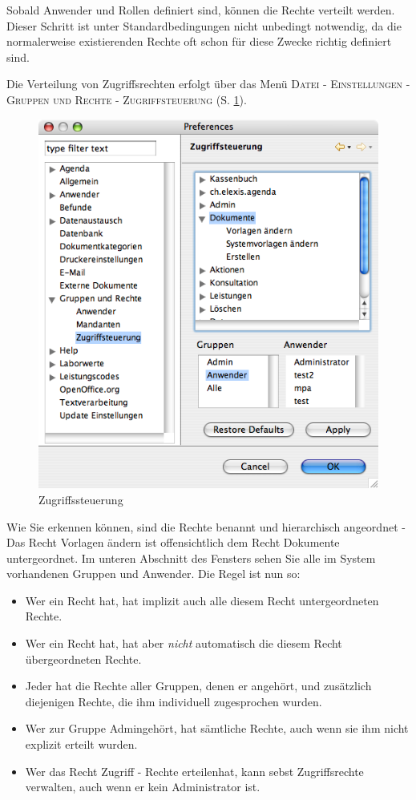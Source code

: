 Sobald Anwender und Rollen definiert sind, können die Rechte verteilt werden.
Dieser Schritt ist unter Standardbedingungen nicht unbedingt notwendig, da die
normalerweise existierenden Rechte oft schon für diese Zwecke richtig definiert
sind.

Die Verteilung von Zugriffsrechten erfolgt über das Menü \textsc{Datei -
Einstellungen - Gruppen und Rechte - Zugriffsteuerung} (S. \ref{fig:zugriff}).
\begin{figure}[htp]
\begin{center}
  \includegraphics{images/zugriff}
  \caption{Zugriffssteuerung}
  \label{fig:zugriff}
\end{center}
\end{figure}

Wie Sie erkennen können, sind die Rechte benannt und hierarchisch angeordnet -
Das Recht \glqq Vorlagen ändern\grqq{} ist offensichtlich dem Recht \glqq
Dokumente\grqq{} untergeordnet. Im unteren Abschnitt des Fensters sehen Sie alle
im System vorhandenen Gruppen und Anwender.
Die Regel ist nun so:
\begin{itemize}
  \item Wer ein Recht hat, hat implizit auch alle diesem Recht untergeordneten
  Rechte.
  \item Wer ein Recht hat, hat aber \textit{nicht} automatisch die diesem Recht
  übergeordneten Rechte.
  \item Jeder hat die Rechte aller Gruppen, denen er angehört, und zusätzlich
  diejenigen Rechte, die ihm individuell zugesprochen wurden.
  \item Wer zur Gruppe \glqq Admin\grqq gehört, hat sämtliche Rechte, auch wenn
  sie ihm nicht explizit erteilt wurden.
  \item Wer das Recht \glqq Zugriff - Rechte erteilen\grqq hat, kann sebst
  Zugriffsrechte verwalten, auch wenn er kein Administrator ist.
\end{itemize}

